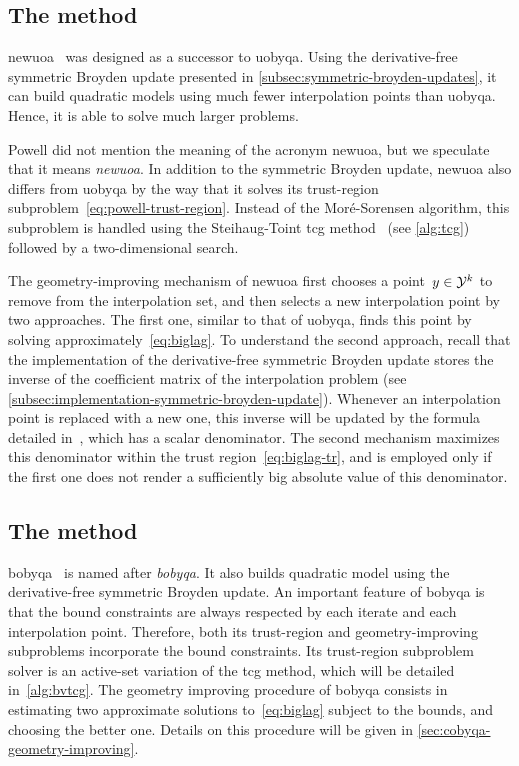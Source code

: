 \subsection{The  method}
\label{subsec:newuoa}

\Gls{newuoa}~\cite{Powell_2006} was designed as a successor to \gls{uobyqa}.
Using the derivative-free symmetric Broyden update presented in \cref{subsec:symmetric-broyden-updates}, it can build quadratic models using much fewer interpolation points than \gls{uobyqa}.
Hence, it is able to solve much larger problems.

Powell did not mention the meaning of the acronym \gls{newuoa}, but we speculate that it means \emph{\glsdesc{newuoa}}.
In addition to the symmetric Broyden update, \gls{newuoa} also differs from \gls{uobyqa} by the way that it solves its trust-region subproblem~\cref{eq:powell-trust-region}.
Instead of the Mor{\'{e}}-Sorensen algorithm, this subproblem is handled using the Steihaug-Toint \gls{tcg} method~\cite{Steihaug_1983,Toint_1981} (see \cref{alg:tcg}) followed by a two-dimensional search.

The geometry-improving mechanism of \gls{newuoa} first chooses a point~$y \in \xpt[k]$ to remove from the interpolation set, and then selects a new interpolation point by two approaches.
The first one, similar to that of \gls{uobyqa}, finds this point by solving approximately~\cref{eq:biglag}.
To understand the second approach, recall that the implementation of the derivative-free symmetric Broyden update stores the inverse of the coefficient matrix of the interpolation problem (see \cref{subsec:implementation-symmetric-broyden-update}).
Whenever an interpolation point is replaced with a new one, this inverse will be updated by the formula detailed in~\cite[Eq.~(2.12)]{Powell_2004c}, which has a scalar denominator.
The second mechanism maximizes this denominator within the trust region~\cref{eq:biglag-tr}, and is employed only if the first one does not render a sufficiently big absolute value of this denominator.

\subsection{The  method}
\label{subsec:bobyqa}

\Gls{bobyqa}~\cite{Powell_2009} is named after \emph{\glsdesc{bobyqa}}.
It also builds quadratic model using the derivative-free symmetric Broyden update.
An important feature of \gls{bobyqa} is that the bound constraints are always respected  by each iterate and each interpolation point.
Therefore, both its trust-region and geometry-improving subproblems incorporate the bound constraints.
Its trust-region subproblem solver is an active-set variation of the \gls{tcg} method, which will be detailed in~\cref{alg:bvtcg}.
The geometry improving procedure of \gls{bobyqa} consists in estimating two approximate solutions to~\cref{eq:biglag} subject to the bounds, and choosing the better one.
Details on this procedure will be given in \cref{sec:cobyqa-geometry-improving}.

